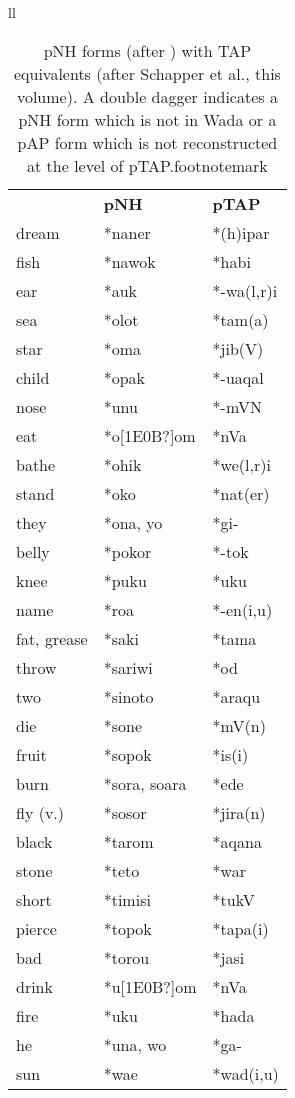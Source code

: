 \begin{table}
\begin{tabular}{ll}
\begin{tabular}{lll}&\textbf{pNH}&\textbf{pTAP}\\
dream&*naner{\ddag}&*(h)ipar\\
fish&*nawok&*habi\\
ear&*{\ng}auk&*-wa(l,r)i\\
sea&*{\ng}olot&*tam(a)\\
star&*{\ng}oma&*jib(V)\\
child&*{\ng}opak&*-uaqal\footnotemark{}\\
nose&*{\ng}unu{\ng}&*-mVN\\
eat&*o[1E0B?]om&*nVa\\
bathe&*ohik{\ddag}&*we(l,r)i\\
stand&*oko&*nat(er)\\
they&*ona, yo&*gi- {\ddag}\\
belly&*pokor&*-tok {\ddag}\\
knee&*puku&*uku {\ddag}\\
name&*ro{\ng}a&*-en(i,u) {\ddag}\\
fat, grease&*saki&*tama {\ddag}\\
throw&*sariwi&*od {\ddag}\\
two&*sinoto&*araqu {\ddag}\\
die &*sone{\ng}&*mV(n)\\
fruit&*sopok&*is(i) {\ddag}\\
burn&*sora, so{\ng}ara&*ede {\ddag}\\
fly (v.)&*sosor&*jira(n) {\ddag}\\
black&*tarom&*aqana {\ddag}\\
stone&*teto&*war\\
short&*timisi&*tukV {\ddag}\\
pierce&*topok&*tapa(i)\\
bad&*torou&*jasi {\ddag}\\
drink&*u[1E0B?]om&*nVa\\
fire&*uku&*hada\\
he&*una, wo&*ga- {\ddag}\\
sun&*wa{\ng}e&*wad(i,u)\\

\end{tabular}
\\

\end{tabular}

\caption{pNH forms (after \citet{Wada1980}) with TAP equivalents (after Schapper et al., this volume). A double dagger {\ddag} indicates a pNH form which is not in Wada or a pAP form which is not reconstructed at the level of pTAP.footnotemark{}}%
\end{table}

